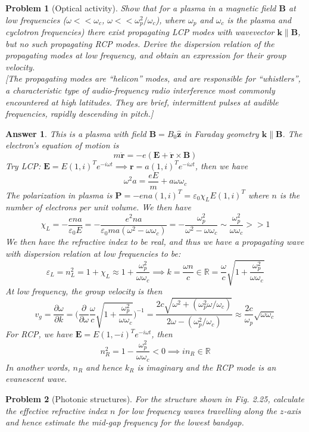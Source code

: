 \documentclass[a4paper]{article}
\newtheorem{ans}{Answer}[section]
\theoremstyle{new}
\newtheorem{qns}{Problem}[section]
\begin{document}
\begin{qns}[Optical activity]
Show that for a plasma in a magnetic field $\mathbf{B}$ at low frequencies ($\omega<<\omega_c$, $\omega<<\omega_p^2/\omega_c$), where $\omega_p$ and $\omega_c$ is the plasma and cyclotron frequencies) there exist propagating LCP modes with wavevector $\mathbf{k}\parallel\mathbf{B}$, but no such propagating RCP modes. Derive the dispersion relation of the propagating modes at low frequency, and obtain an expression for their group velocity.\\[5pt]
[The propagating modes are “helicon” modes, and are responsible for “whistlers”, a characteristic type of audio-frequency radio interference most commonly encountered at high latitudes. They are brief, intermittent pulses at audible frequencies, rapidly descending in pitch.]
\end{qns}
\newpage
\begin{ans}
This is a plasma with field $\mathbf{B}=B_0\mathbf{\hat{z}}$ in Faraday geometry $\mathbf{k}\parallel\mathbf{B}$. The electron's equation of motion is
$$m\mathbf{\ddot{r}}=-e(\mathbf{E}+\mathbf{\ddot{r}}\times\mathbf{B})$$
Try LCP: $\mathbf{E}=E(1,i)^Te^{-i\omega t}\implies\mathbf{r}=a(1,i)^Te^{-i\omega t}$, then we have
$$\omega^2a=\frac{eE}{m}+a\omega\omega_c$$
The polarization in plasma is $\mathbf{P}=-ena(1,i)^T=\varepsilon_0\chi_LE(1,i)^T$ where $n$ is the number of electrons per unit volume. We then have
$$\chi_L=-\frac{ena}{\varepsilon_0E}=-\frac{e^2na}{\varepsilon_0ma(\omega^2-\omega\omega_c)}=-\frac{\omega_p^2}{\omega^2-\omega\omega_c}\sim\frac{\omega_p^2}{\omega\omega_c}>>1$$
We then have the refractive index to be real, and thus we have a propagating wave with dispersion relation at low frequencies to be:
$$\varepsilon_L=n_L^2=1+\chi_L\approx 1+\frac{\omega_p^2}{\omega\omega_c}\implies k=\frac{\omega n}{c}\in\mathbb{R}=\frac{\omega}{c}\sqrt{1+\frac{\omega_p^2}{\omega\omega_c}}$$
At low frequency, the group velocity is then
$$v_g=\frac{\partial\omega}{\partial k}=\bigg(\frac{\partial}{\partial\omega}\frac{\omega}{c}\sqrt{1+\frac{\omega_p^2}{\omega\omega_c}}\bigg)^{-1}=\frac{2c\sqrt{\omega^2+(\omega_p^2\omega/\omega_c)}}{2\omega-(\omega_p^2/\omega_c)}\approx\frac{2c}{\omega_p}\sqrt{\omega\omega_c}$$
For RCP, we have $\mathbf{E}=E(1,-i)^Te^{-i\omega t}$, then
$$n_R^2=1-\frac{\omega_p^2}{\omega\omega_c}<0\implies in_R\in\mathbb{R}$$
In another words, $n_R$ and hence $k_R$ is imaginary and the RCP mode is an evanescent wave.
\end{ans}
\begin{qns}[Photonic structures]
For the structure shown in Fig. 2.25, calculate the effective refractive index $n$ for low frequency waves travelling along the $z$-axis and hence estimate the mid-gap frequency for the lowest bandgap.
\end{qns}
\end{document}
